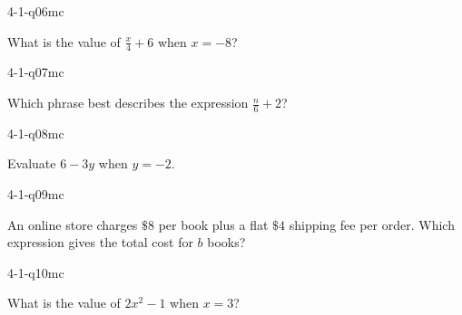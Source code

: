 \begin{practiceQuestion}{4-1-q06}{mc}
\begin{questionText}
What is the value of $\frac{x}{4} + 6$ when $x = -8$?
\end{questionText}
\end{practiceQuestion}

\begin{practiceQuestion}{4-1-q07}{mc}
\begin{questionText}
Which phrase best describes the expression $\frac{n}{6} + 2$?
\end{questionText}
\end{practiceQuestion}

\begin{practiceQuestion}{4-1-q08}{mc}
\begin{questionText}
Evaluate $6 - 3y$ when $y = -2$.
\end{questionText}
\end{practiceQuestion}

\begin{practiceQuestion}{4-1-q09}{mc}
\begin{questionText}
An online store charges $\$8$ per book plus a flat $\$4$ shipping fee per order. Which expression gives the total cost for $b$ books?
\end{questionText}
\end{practiceQuestion}

\begin{practiceQuestion}{4-1-q10}{mc}
\begin{questionText}
What is the value of $2x^2 - 1$ when $x = 3$?
\end{questionText}
\end{practiceQuestion}

